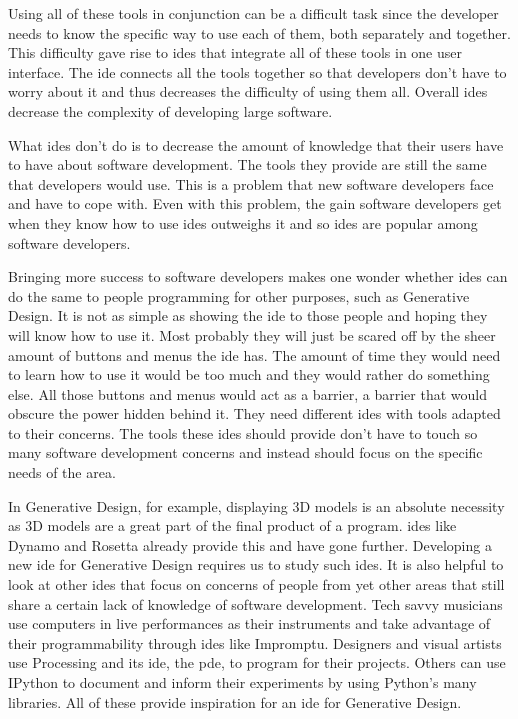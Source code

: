 \documentclass{./llncs2e/llncs}
\begin{document}
	Using all of these tools in conjunction can be a difficult task since the developer needs to know the specific way to use each of them, both separately and together.
	This difficulty gave rise to \ac{ide}s that integrate all of these tools in one user interface.
	The \ac{ide} connects all the tools together so that developers don't have to worry about it and thus decreases the difficulty of using them all.
	Overall \ac{ide}s decrease the complexity of developing large software.

	What \ac{ide}s don't do is to decrease the amount of knowledge that their users have to have about software development.
	The tools they provide are still the same that developers would use.
	This is a problem that new software developers face and have to cope with.
	Even with this problem, the gain software developers get when they know how to use \ac{ide}s outweighs it and so \ac{ide}s are popular among software developers.

	Bringing more success to software developers makes one wonder whether \ac{ide}s can do the same to people programming for other purposes, such as Generative Design.
	It is not as simple as showing the \ac{ide} to those people and hoping they will know how to use it.
	Most probably they will just be scared off by the sheer amount of buttons and menus the \ac{ide} has.
	The amount of time they would need to learn how to use it would be too much and they would rather do something else.
	All those buttons and menus would act as a barrier, a barrier that would obscure the power hidden behind it.
	They need different \ac{ide}s with tools adapted to their concerns.
	The tools these \ac{ide}s should provide don't have to touch so many software development concerns and instead should focus on the specific needs of the area.

	In Generative Design, for example, displaying 3D models is an absolute necessity as 3D models are a great part of the final product of a program.
	\ac{ide}s like Dynamo and Rosetta already provide this and have gone further.
	Developing a new \ac{ide} for Generative Design requires us to study such \ac{ide}s.
	It is also helpful to look at other \ac{ide}s that focus on concerns of people from yet other areas that still share a certain lack of knowledge of software development.
	Tech savvy musicians use computers in live performances as their instruments and take advantage of their programmability through \ac{ide}s like Impromptu.
	Designers and visual artists use Processing and its \ac{ide}, the \ac{pde}, to program for their projects.
	Others can use IPython to document and inform their experiments by using Python's many libraries.
	All of these provide inspiration for an \ac{ide} for Generative Design.
	
\end{document}
